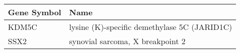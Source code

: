 \begin{tabular}{ll}
\toprule
Gene Symbol &                                         Name \\
\midrule
      KDM5C & lysine (K)-specific demethylase 5C (JARID1C) \\
       SSX2 &             synovial sarcoma, X breakpoint 2 \\
\bottomrule
\end{tabular}

